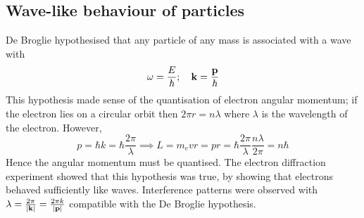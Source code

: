 \subsection{Wave-like behaviour of particles}
De Broglie hypothesised that any particle of any mass is associated with a wave with
\[
	\omega = \frac{E}{\hbar}; \quad \vb k = \frac{\vb p}{\hbar}
\]
This hypothesis made sense of the quantisation of electron angular momentum; if the electron lies on a circular orbit then \( 2 \pi r = n \lambda \) where \( \lambda \) is the wavelength of the electron.
However,
\[
	p = \hbar k = \hbar \frac{2 \pi}{\lambda} \implies L = m_e v r = p r = \hbar \frac{2 \pi}{\lambda} \frac{n \lambda}{2 \pi} = n \hbar
\]
Hence the angular momentum must be quantised.
The electron diffraction experiment showed that this hypothesis was true, by showing that electrons behaved sufficiently like waves.
Interference patterns were observed with \( \lambda = \frac{2 \pi}{\abs{\vb k}} = \frac{2 \pi k}{\abs{\vb p}} \) compatible with the De Broglie hypothesis.


